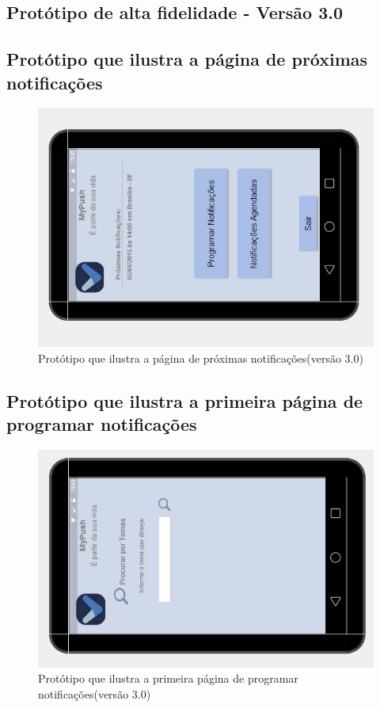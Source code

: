 \begin{apendicesenv}
\chapter{Protótipo de alta fidelidade - Versão 3.0} 

    \section*{Protótipo que ilustra a página de próximas notificações}

    \begin{figure}[!htbp]
      \centering
      \includegraphics[scale=0.5, angle=-90]{editaveis/figuras/prototipo_alta_fidelidade_v3/3_1}
      \caption{Protótipo que ilustra a página de próximas notificações(versão 3.0)}
      \label{v3}
    \end{figure}
    
      \section*{Protótipo que ilustra a primeira página de programar notificações}

    \begin{figure}[!htbp]
      \centering
      \includegraphics[scale=0.5, angle=-90]{editaveis/figuras/prototipo_alta_fidelidade_v3/3_2}
      \caption{Protótipo que ilustra a primeira página de programar notificações(versão 3.0)}
      \label{v3}
    \end{figure}
    

\end{apendicesenv}
